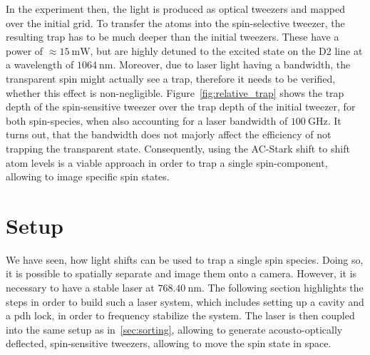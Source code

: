 In the experiment then, the light is produced as optical tweezers and mapped over the initial grid. To transfer the atoms into the spin-selective tweezer, the resulting trap has to be much deeper than the initial tweezers. These have a power of $\approx\SI{15}{\milli\watt}$, but are highly detuned to the excited state on the D2 line at a wavelength of $\SI{1064}{\nano\meter}$. Moreover, due to laser light having a bandwidth, the transparent spin might actually see a trap, therefore it needs to be verified, whether this effect is non-negligible. Figure~\ref{fig:relative_trap} shows the trap depth of the spin-sensitive tweezer over the trap depth of the initial tweezer, for both spin-species, when also accounting for a laser bandwidth of $\SI{100}{\giga\hertz}$. It turns out, that the bandwidth does not majorly affect the efficiency of not trapping the transparent state. Consequently, using the AC-Stark shift to shift atom levels is a viable approach in order to trap a single spin-component, allowing to image specific spin states.


\begin{figure}[t]%
\end{figure}

\section{Setup}

We have seen, how light shifts can be used to trap a single spin species. Doing so, it is possible to spatially separate and image them onto a camera. However, it is necessary to have a stable laser at $\SI{768.40}{\nano\meter}$. The following section highlights the steps in order to build such a laser system, which includes setting up a cavity and a \ac{pdh} lock, in order to frequency stabilize the system. The laser is then coupled into the same setup as in~\ref{sec:sorting}, allowing to generate acousto-optically deflected, spin-sensitive tweezers, allowing to move the spin state in space.

